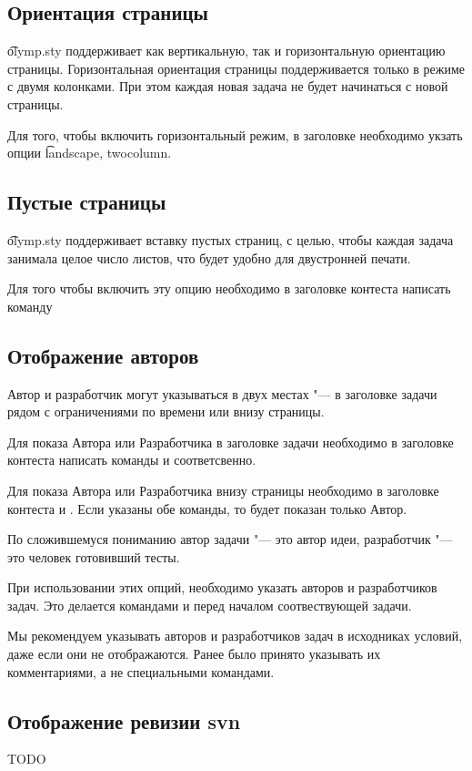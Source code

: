 \documentclass[11pt,a4paper,oneside]{article}
\begin{document}
\subsection{Ориентация страницы}

\t{olymp.sty} поддерживает как вертикальную, так и горизонтальную ориентацию страницы.
Горизонтальная ориентация страницы поддерживается только в режиме с двумя колонками.
При этом каждая новая задача не будет начинаться с новой страницы.

Для того, чтобы включить горизонтальный режим, в заголовке 
необходимо укзать опции \t{landscape, twocolumn}.

\subsection{Пустые страницы}
\t{olymp.sty} поддерживает вставку пустых страниц, с целью, чтобы каждая задача занимала
целое число листов, что будет удобно для двустронней печати.

Для того чтобы включить эту опцию необходимо в заголовке контеста написать команду

\subsection{Отображение авторов}
Автор и разработчик могут указываться в двух местах "--- в заголовке задачи
рядом с ограничениями по времени или внизу страницы.

Для показа Автора или Разработчика в заголовке задачи необходимо в заголовке контеста 
написать команды 
 и
 соответсвенно.

Для показа Автора или Разработчика внизу страницы необходимо в заголовке контеста 
 и . 
Если указаны обе команды, то будет показан только Автор.

По сложившемуся пониманию автор задачи "--- это автор идеи, разработчик "--- это
человек готовивший тесты.

При использовании этих опций, необходимо указать авторов и разработчиков задач.
Это делается командами \unskip{}
и \unskip{} перед началом соотвествующей
задачи.

Мы рекомендуем указывать авторов и разработчиков задач в исходниках условий, даже если
они не отображаются. Ранее было принято указывать их комментариями, а не специальными командами.

\subsection{Отображение ревизии svn}


TODO
\end{document}

